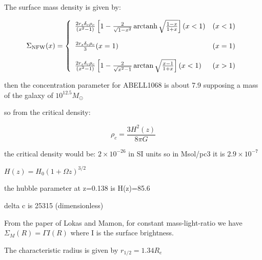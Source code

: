 The surface mass density is given by:

\begin{equation}
\Sigma_{\text{NFW}}(x) = \left\lbrace
\begin{array}{lll}
\frac{2r_{s}\delta_{c}\rho_{c}}{\left(x^{2}-1\right)}\left[1-\frac{2}{\sqrt{1-x^{2}}}\operatorname{arctanh}\sqrt{\frac{1-x}{1+x}}\right](x<1) & (x<1)\\\\
\frac{2r_{s}\delta_{c}\rho_{c}}{3}(x=1) & (x=1)\\\\
\frac{2r_{s}\delta_{c}\rho_{c}}{\left(x^{2}-1\right)}\left[1-\frac{2}{\sqrt{x^{2}-1}}\arctan\sqrt{\frac{x-1}{1+x}}\right](x<1) & (x>1)
\end{array}
\right.
\end{equation} 


then the concentration parameter for ABELL1068 is about 7.9 supposing a mass of the galaxy of $10^{12.5}M_{\odot}$

so from the critical density:

\begin{equation}
\rho_{c}=\frac{3H^2(z)}{8\pi G}
\end{equation}

the critical density would be: $2\times 10^{-26}$ in SI units so in Msol/pc3 it is $2.9\times 10^{-7}$

$H(z)=H_{0}(1+\Omega z)^{3/2}$

the hubble parameter at z=0.138 is H(z)=85.6

delta c is 25315 (dimensionless)

From the paper of Lokas and Mamon, for constant mass-light-ratio we have $\Sigma_{M}(R)=\Gamma I(R)$ where I is the surface brightness.

The characteristic radius is given by $r_{1/2}=1.34R_{e}$
